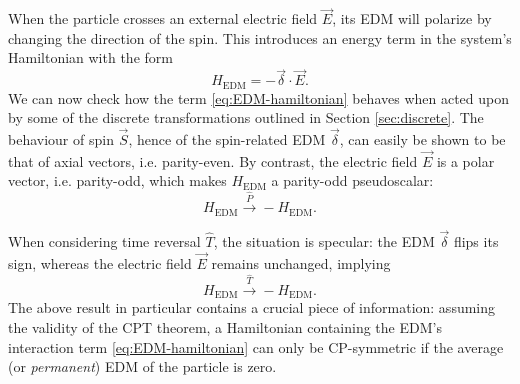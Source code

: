 When the particle crosses an external electric field $\vec{E}$, its EDM will polarize by changing the direction of the spin. This introduces an energy term in the system's Hamiltonian with the form
\begin{equation}
H_\text{EDM} = - \vec{\delta} \cdot \vec{E} .
\label{eq:EDM-hamiltonian}
\end{equation}
We can now check how the term \eqref{eq:EDM-hamiltonian} behaves when acted upon by some of the discrete transformations outlined in Section \ref{sec:discrete}.
The behaviour of spin $\vec{S}$,
hence of the spin-related EDM $\vec{\delta}$, can easily be shown to be 
that of axial vectors, i.e. parity-even.
By contrast, the electric field $\vec{E}$ is a polar vector, i.e. parity-odd, which makes $H_\text{EDM}$ a parity-odd pseudoscalar:
\begin{equation}
H_\text{EDM} \xrightarrow{\hat{P}} - H_\text{EDM}.
\label{eq:EDM-hamiltonian-under-P}
\end{equation}

When considering time reversal $\hat{T}$, the situation is specular:
the EDM $\vec{\delta}$ flips its sign, whereas the electric field $\vec{E}$ remains unchanged, implying
\begin{equation}
H_\text{EDM} \xrightarrow{\hat{T}} - H_\text{EDM}.
\label{eq:EDM-hamiltonian-under-T}
\end{equation}
The above result in particular contains a crucial piece of information:
assuming the validity of the CPT theorem, a Hamiltonian containing the EDM's interaction term \eqref{eq:EDM-hamiltonian} can only be CP-symmetric if the average (or \textit{permanent}) EDM of the particle is zero.


